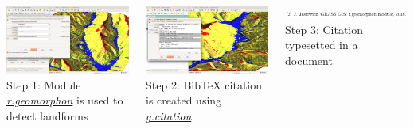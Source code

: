 \documentclass[25pt, margin=0mm, innermargin=25mm, blockverticalspace=25mm, colspace=25mm, subcolspace=8mm]{tikzposter}
\newcommand{\CustomBlockFontSize}{\Large}
\newcommand{\gmodule}[1]{\href{http://grass.osgeo.org/grass74/manuals/#1.html}{\emph{#1}}}
\begin{document}
\begin{columns}
{\CustomBlockFontSize

\nocite{ncalm_nantahala_2009}

\begin{minipage}{\linewidth}
\centering
\includegraphics[width=\linewidth]{r_geomorphon}
\\
Step 1: Module \gmodule{r.geomorphon} is used to detect landforms
\end{minipage}

\vspace*{2ex}

\begin{minipage}{\linewidth}
\centering
\includegraphics[width=\linewidth]{citation_gui_bibtex}
\\
Step 2: BibTeX citation is created using \gmodule{g.citation}
\end{minipage}

\vspace*{2ex}

\begin{minipage}{\linewidth}
\centering
\vspace*{2ex}
\includegraphics[width=\linewidth]{reference_in_latex}
\vspace*{1.2ex}
\\
Step 3: Citation typesetted in a document
\end{minipage}

}
\end{columns}
\end{document}
